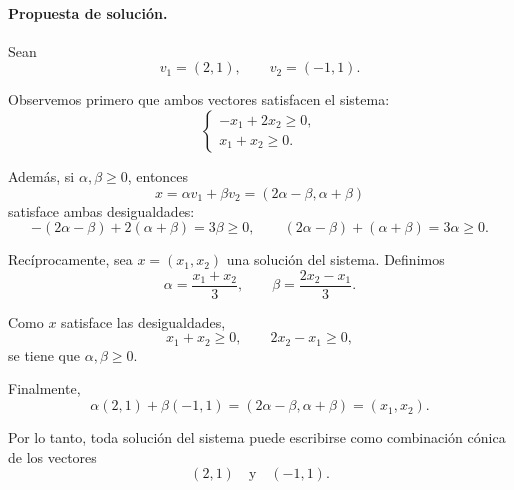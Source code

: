 \documentclass[a4paper,12pt]{article}
\begin{document}
\begin{exerciselist}
\paragraph{Propuesta de solución.}

Sean
\[
v_1=(2,1),
\qquad
v_2=(-1,1).
\]

Observemos primero que ambos vectores satisfacen el sistema:
\[
\begin{cases}
-x_1+2x_2\geq 0,\\
x_1+x_2\geq 0.
\end{cases}
\]

Además, si \(\alpha,\beta\geq 0\), entonces
\[
x=\alpha v_1+\beta v_2 = (2\alpha-\beta,\alpha+\beta)
\]
satisface ambas desigualdades:
\[
-(2\alpha-\beta) + 2(\alpha+\beta) = 3\beta \geq 0,
\qquad
(2\alpha-\beta) + (\alpha+\beta) = 3\alpha \geq 0 .
\]

Recíprocamente, sea \(x=(x_1,x_2)\) una solución del sistema. Definimos
\[
\alpha=\frac{x_1+x_2}{3},
\qquad
\beta=\frac{2x_2-x_1}{3}.
\]

Como \(x\) satisface las desigualdades,
\[
x_1+x_2\geq 0,
\qquad
2x_2-x_1\geq 0,
\]
se tiene que \(\alpha,\beta\geq 0\).

Finalmente,
\[
\alpha(2,1)+\beta(-1,1)
=
(2\alpha-\beta,\alpha+\beta)
=
(x_1,x_2).
\]

Por lo tanto, toda solución del sistema puede escribirse como combinación cónica de los vectores
\[
(2,1)
\quad\text{y}\quad
(-1,1).
\]



\end{exerciselist}
\end{document}
